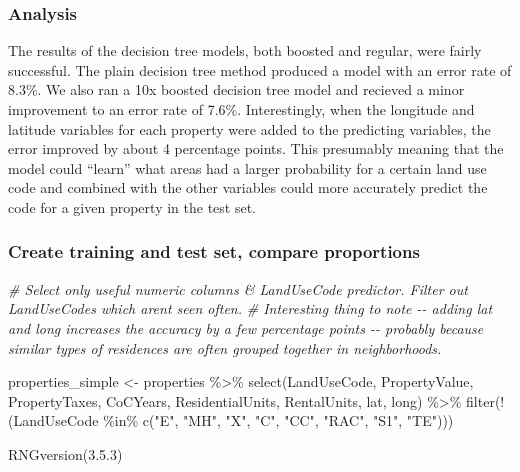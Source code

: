\documentclass[
]{article}
\newenvironment{Shaded}{\begin{snugshade}}{\end{snugshade}}
\newcommand{\CommentTok}[1]{\textcolor[rgb]{0.56,0.35,0.01}{\textit{#1}}}
\newcommand{\FunctionTok}[1]{\textcolor[rgb]{0.00,0.00,0.00}{#1}}
\newcommand{\NormalTok}[1]{#1}
\newcommand{\OtherTok}[1]{\textcolor[rgb]{0.56,0.35,0.01}{#1}}
\newcommand{\SpecialCharTok}[1]{\textcolor[rgb]{0.00,0.00,0.00}{#1}}
\newcommand{\StringTok}[1]{\textcolor[rgb]{0.31,0.60,0.02}{#1}}
\begin{document}
\hypertarget{analysis}{%
\subsubsection{Analysis}\label{analysis}}

The results of the decision tree models, both boosted and regular, were
fairly successful. The plain decision tree method produced a model with
an error rate of 8.3\%. We also ran a 10x boosted decision tree model
and recieved a minor improvement to an error rate of 7.6\%.
Interestingly, when the longitude and latitude variables for each
property were added to the predicting variables, the error improved by
about 4 percentage points. This presumably meaning that the model could
``learn'' what areas had a larger probability for a certain land use
code and combined with the other variables could more accurately predict
the code for a given property in the test set.

\hypertarget{create-training-and-test-set-compare-proportions}{%
\subsubsection{Create training and test set, compare
proportions}\label{create-training-and-test-set-compare-proportions}}

\begin{Shaded}
\begin{Highlighting}[]
\CommentTok{\# Select only useful numeric columns \& LandUseCode predictor. Filter out LandUseCodes which aren\textquotesingle{}t seen often.}
\CommentTok{\# Interesting thing to note {-}{-} adding lat and long increases the accuracy by a few percentage points {-}{-} probably because similar types of residences are often grouped together in neighborhoods.}

\NormalTok{properties\_simple }\OtherTok{\textless{}{-}}\NormalTok{ properties }\SpecialCharTok{\%\textgreater{}\%} \FunctionTok{select}\NormalTok{(LandUseCode, PropertyValue, PropertyTaxes, CoCYears, ResidentialUnits, RentalUnits, lat, long) }\SpecialCharTok{\%\textgreater{}\%} \FunctionTok{filter}\NormalTok{(}\SpecialCharTok{!}\NormalTok{(LandUseCode }\SpecialCharTok{\%in\%} \FunctionTok{c}\NormalTok{(}\StringTok{"E"}\NormalTok{, }\StringTok{"MH"}\NormalTok{, }\StringTok{"X"}\NormalTok{, }\StringTok{"C"}\NormalTok{, }\StringTok{"CC"}\NormalTok{, }\StringTok{"RAC"}\NormalTok{, }\StringTok{"S1"}\NormalTok{, }\StringTok{"TE"}\NormalTok{)))}

\FunctionTok{RNGversion}\NormalTok{(}\StringTok{\textquotesingle{}3.5.3\textquotesingle{}}\NormalTok{)}
\end{Highlighting}
\end{Shaded}
\end{document}
